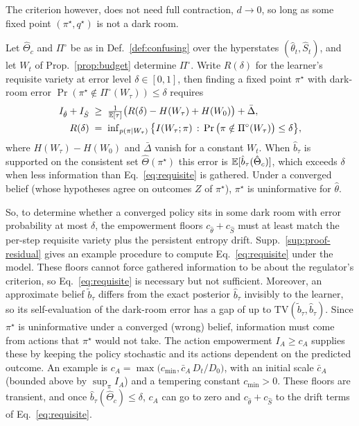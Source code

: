 The criterion however, does not need full contraction, $d \rightarrow 0$, so long as some fixed point $(\pi^\star, q^\star)$ is not a dark room.
\begin{theorem}
\label{cor:residual}
    Let $\hat\Theta_c$ and $\Pi^\circ$ be as in Def.~\ref{def:confusing} over the hyperstates $(\hat\theta_t, \hat S_t)$, and let $W_t$ of Prop.~\ref{prop:budget} determine $\Pi^\circ$.
    Write $R(\delta)$ for the learner's requisite variety at error level $\delta \in [0, 1]$, then finding a fixed point $\pi^\star$ with dark-room error ${\Pr(\pi^\star \notin \Pi^\circ(W_\tau))} \le \delta$ requires
    \begin{equation} \label{eq:requisite}
        \begin{aligned}
          I_{\hat\theta} + I_{\hat S} \;&\ge\; \tfrac{1}{\mathbb E[\tau]} \big( R(\delta) - H(W_\tau) + H(W_0) \big) + \bar\Delta, \\
          R(\delta) \;&=\; \inf\nolimits_{p(\pi \mid W_\tau)} \big\{ I(W_\tau; \pi) \,:\, \Pr\big(\pi \notin \Pi^\circ(W_\tau)\big) \le \delta \big\},
        \end{aligned}
    \end{equation}
    where $H(W_\tau) - H(W_0)$ and $\bar\Delta$ vanish for a constant $W_t$.
    When $\hat b_\tau$ is supported on the consistent set $\hat\Theta(\pi^\star)$ this error is $\mathbb E[\hat b_\tau(\hat\Theta_c)]$, which exceeds $\delta$ when less information than Eq.~\eqref{eq:requisite} is gathered.
    Under a converged belief (whose hypotheses agree on outcomes $Z$ of $\pi^\star$), $\pi^\star$ is uninformative for $\hat\theta$.
\end{theorem}
So, to determine whether a converged policy sits in some dark room with error probability at most $\delta$, the empowerment floors $c_{\hat\theta} + c_{\hat S}$ must at least match the per-step requisite variety plus the persistent entropy drift.
Supp.~\ref{sup:proof-residual} gives an example procedure to compute Eq.~\eqref{eq:requisite} under the model.
These floors cannot force gathered information to be about the regulator's criterion, so Eq.~\eqref{eq:requisite} is necessary but not sufficient.
Moreover, an approximate belief $\tilde b_\tau$ differs from the exact posterior $\hat b_\tau$ invisibly to the learner, so its self-evaluation of the dark-room error has a gap of up to $\mathrm{TV}(\tilde b_\tau, \hat b_\tau)$.
Since $\pi^\star$ is uninformative under a converged (wrong) belief, information must come from actions that $\pi^\star$ would not take.
The action empowerment $I_A \ge c_A$ supplies these by keeping the policy stochastic and its actions dependent on the predicted outcome.
An example is $c_A = \max\big(c_{\min}, \bar c_A\, D_t / D_0\big)$, with an initial scale $\bar c_A$ (bounded above by $\sup_\pi I_A$) and a tempering constant $c_{\min} > 0$.
These floors are transient, and once $\hat b_\tau(\hat\Theta_c) \le \delta$, $c_A$ can go to zero and $c_{\hat\theta} + c_{\hat S}$ to the drift terms of Eq.~\eqref{eq:requisite}.

